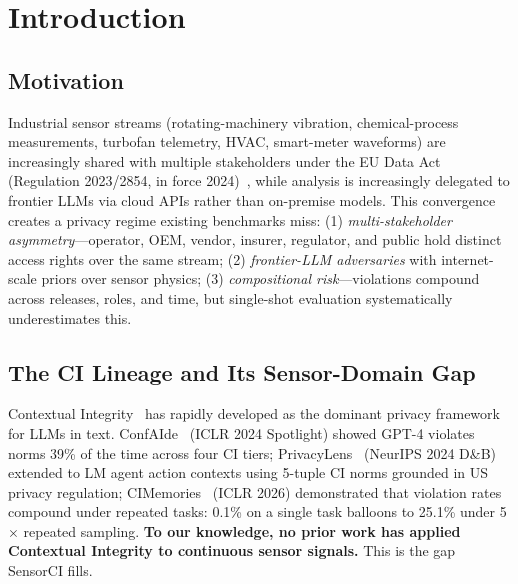 \documentclass{article}
\theoremstyle{remark}
\begin{document}
\section{Introduction}
\label{sec:intro}

\subsection{Motivation}
Industrial sensor streams (rotating-machinery vibration, chemical-process measurements, turbofan telemetry, HVAC, smart-meter waveforms) are increasingly shared with multiple stakeholders under the EU Data Act (Regulation 2023/2854, in force 2024)~\cite{eu_data_act}, while analysis is increasingly delegated to frontier LLMs via cloud APIs rather than on-premise models. This convergence creates a privacy regime existing benchmarks miss: (1) \emph{multi-stakeholder asymmetry}---operator, OEM, vendor, insurer, regulator, and public hold distinct access rights over the same stream; (2) \emph{frontier-LLM adversaries} with internet-scale priors over sensor physics; (3) \emph{compositional risk}---violations compound across releases, roles, and time, but single-shot evaluation systematically underestimates this.

\subsection{The CI Lineage and Its Sensor-Domain Gap}
Contextual Integrity~\cite{nissenbaum2004} has rapidly developed as the dominant privacy framework for LLMs in text. ConfAIde~\cite{confaide} (ICLR 2024 Spotlight) showed GPT-4 violates norms 39\% of the time across four CI tiers; PrivacyLens~\cite{privacylens} (NeurIPS 2024 D\&B) extended to LM agent action contexts using 5-tuple CI norms grounded in US privacy regulation; CIMemories~\cite{cimemories} (ICLR 2026) demonstrated that violation rates compound under repeated tasks: 0.1\% on a single task balloons to 25.1\% under 5$\times$ repeated sampling. \textbf{To our knowledge, no prior work has applied Contextual Integrity to continuous sensor signals.} This is the gap SensorCI fills.
\end{document}
